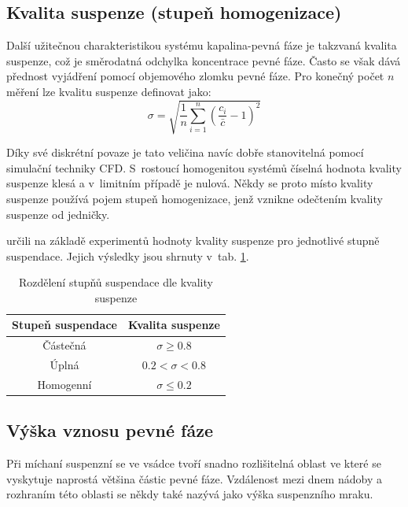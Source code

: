 \subsection{Kvalita suspenze (stupeň homogenizace)}
Další užitečnou charakteristikou systému kapalina-pevná fáze je takzvaná kvalita suspenze, což je směrodatná odchylka koncentrace pevné fáze. Často se však dává přednost vyjádření pomocí objemového zlomku pevné fáze. Pro konečný počet $n$ měření lze kvalitu suspenze definovat jako:
\begin{equation}
	\sigma = \sqrt{\frac{1}{n}\sum_{i=1}^{n}\left(\frac{c_{i}}{\bar{c}} - 1\right)^{2}}
	\label{eq:kvasus}
\end{equation}  

\noindent Díky své diskrétní povaze je tato veličina navíc dobře stanovitelná pomocí simulační techniky CFD. S~rostoucí homogenitou systémů číselná hodnota kvality suspenze klesá a v~limitním případě je nulová. Někdy se proto místo kvality suspenze používá pojem stupeň homogenizace, jenž vznikne odečtením kvality suspenze od jedničky.

\citet{boh80} určili na základě experimentů hodnoty kvality suspenze pro jednotlivé stupně suspendace. Jejich výsledky jsou shrnuty v~tab. \ref{tab:kvasus}.

\begin{table}[h!]
\begin{center}
\caption{Rozdělení stupňů suspendace dle kvality suspenze}
\label{tab:kvasus}
\begin{tabular}{cc}
\toprule
Stupeň suspendace & Kvalita suspenze \\
\midrule

Částečná &  $\sigma \geq \num{0.8}$ \\
Úplná & $\num{0.2} < \sigma < \num{0.8}$ \\
Homogenní & $\sigma \leq \num{0.2}$ \\

\bottomrule
\end{tabular}
\end{center}
\end{table}

\subsection{Výška vznosu pevné fáze}
Při míchaní suspenzní se ve vsádce tvoří snadno rozlišitelná oblast ve které se vyskytuje naprostá většina částic pevné fáze. Vzdálenost mezi dnem nádoby a rozhraním této oblasti se někdy také nazývá jako výška suspenzního mraku. 

